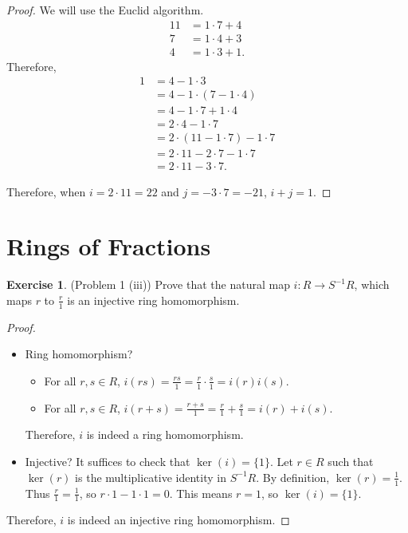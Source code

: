 \documentclass[12pt, psamsfonts]{amsart}
\theoremstyle{definition}
\newtheorem*{exer}{Exercise}
\theoremstyle{remark}
\numberwithin{equation}{section}
\begin{document}
\begin{proof}
  We will use the Euclid algorithm.
  \begin{align*}
    11 &= 1 \cdot 7 + 4 \\
    7 &= 1 \cdot 4 + 3 \\
    4 &= 1 \cdot 3 + 1.
  \end{align*}
  Therefore,
  \begin{align*}
    1 &= 4 - 1 \cdot 3 \\
      &= 4 - 1 \cdot (7 - 1 \cdot 4) \\
      &= 4 - 1 \cdot 7 + 1 \cdot 4 \\
      &= 2 \cdot 4 - 1 \cdot 7 \\
      &= 2 \cdot (11 - 1 \cdot 7) - 1 \cdot 7 \\
      &= 2 \cdot 11 - 2 \cdot 7 - 1 \cdot 7 \\
      &= 2 \cdot 11 - 3 \cdot 7.
  \end{align*}

  Therefore, when $i = 2 \cdot 11 = 22$ and $j = -3 \cdot 7 = -21$, $i + j = 1$.
\end{proof}


\section{Rings of Fractions}
\begin{exer}{(Problem 1 (iii))}
  Prove that the natural map $i: R \rightarrow S^{-1}R$, which maps $r$ to $\frac{r}{1}$ is an injective ring homomorphism.
\end{exer}

\begin{proof}
  $ $
  \begin{itemize}
    \item
      Ring homomorphism?
      \begin{itemize}
        \item
          For all $r, s \in R$, $i(rs) = \frac{rs}{1} = \frac{r}{1} \cdot \frac{s}{1} = i(r)i(s)$.
        \item
          For all $r, s \in R$, $i(r + s) = \frac{r + s}{1} = \frac{r}{1} + \frac{s}{1} = i(r) + i(s)$.
      \end{itemize}
      Therefore, $i$ is indeed a ring homomorphism.
    \item
      Injective?
      It suffices to check that $\ker(i) = \{ 1 \}$.
      Let $r \in R$ such that $\ker(r)$ is the multiplicative identity in $S^{-1}R$.
      By definition, $\ker(r) = \frac{1}{1}$.
      Thus $\frac{r}{1} = \frac{1}{1}$, so $r \cdot 1 - 1 \cdot 1 = 0$.
      This means $r = 1$, so $\ker(i) = \{ 1 \}$.
  \end{itemize}
  Therefore, $i$ is indeed an injective ring homomorphism.
\end{proof}
\end{document}
